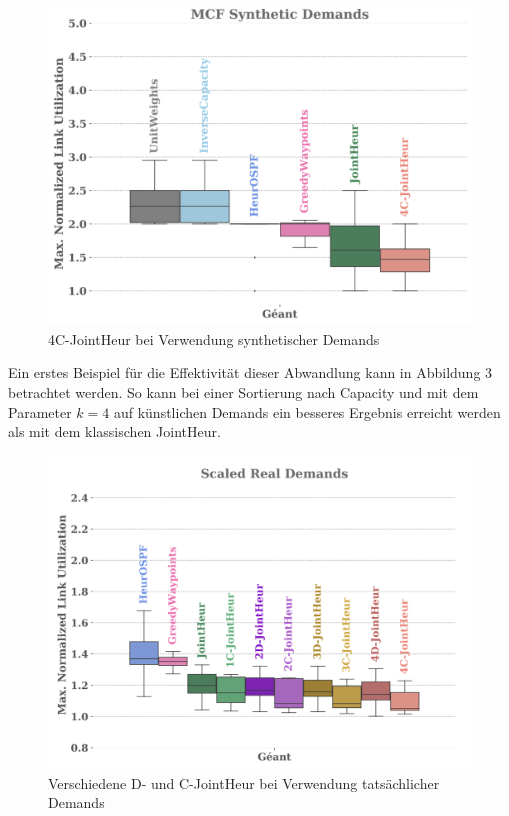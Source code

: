 \documentclass[sigconf,noacm,review]{acmart}
\begin{document}
\begin{figure}[h]
  \centering 
  \includegraphics[width=\linewidth]{abbildungen/PNG-Bild}
  \caption{4C-JointHeur bei Verwendung synthetischer Demands}
\end{figure}
Ein erstes Beispiel für die Effektivität dieser Abwandlung kann in Abbildung 3 betrachtet werden. So kann bei einer Sortierung nach Capacity und mit dem Parameter $k=4$ auf künstlichen Demands ein besseres Ergebnis erreicht werden als mit dem klassischen JointHeur. 
\begin{figure}[h]
  \centering 
  \includegraphics[width=\linewidth]{abbildungen/PNG-Bild 2}
  \caption{Verschiedene D- und C-JointHeur bei Verwendung tatsächlicher Demands}
\end{figure}
\end{document}
